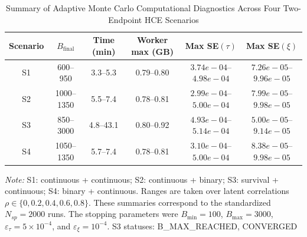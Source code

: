 \begin{table}[ht!]
\centering
\caption{Summary of Adaptive Monte Carlo Computational Diagnostics Across Four Two-Endpoint HCE Scenarios}
\label{tab:all_scenarios_computation_summary}
\setlength{\tabcolsep}{3pt}
\small
\begin{tabular}{@{}cccccc@{}}
\toprule
Scenario & $B_{\text{final}}$ & Time (min) & Worker max (GB) & Max SE$(\tau)$ & Max SE$(\xi)$ \\
\midrule
S1 & 600--950 & 3.3--5.3 & 0.79--0.80 & $3.74e-04$--$4.98e-04$ & $7.26e-05$--$9.96e-05$ \\
S2 & 1000--1350 & 5.5--7.4 & 0.78--0.81 & $2.99e-04$--$5.00e-04$ & $7.99e-05$--$9.98e-05$ \\
S3 & 850--3000 & 4.8--43.1 & 0.80--0.92 & $4.93e-04$--$5.14e-04$ & $5.00e-05$--$9.14e-05$ \\
S4 & 1050--1350 & 5.7--7.4 & 0.78--0.81 & $3.10e-04$--$5.00e-04$ & $8.38e-05$--$9.98e-05$ \\
\bottomrule
\end{tabular}
\parbox{0.92\textwidth}{\footnotesize \textit{Note:} S1: continuous + continuous; S2: continuous + binary; S3: survival + continuous; S4: binary + continuous. Ranges are taken over latent correlations $\rho \in \{0, 0.2, 0.4, 0.6, 0.8\}$. These summaries correspond to the standardized $N_{sp}=2000$ runs. The stopping parameters were $B_{\min}=100$, $B_{\max}=3000$, $\varepsilon_{\tau}=5\times 10^{-4}$, and $\varepsilon_{\xi}=10^{-4}$. S3 statuses: B_MAX_REACHED, CONVERGED}
\end{table}
